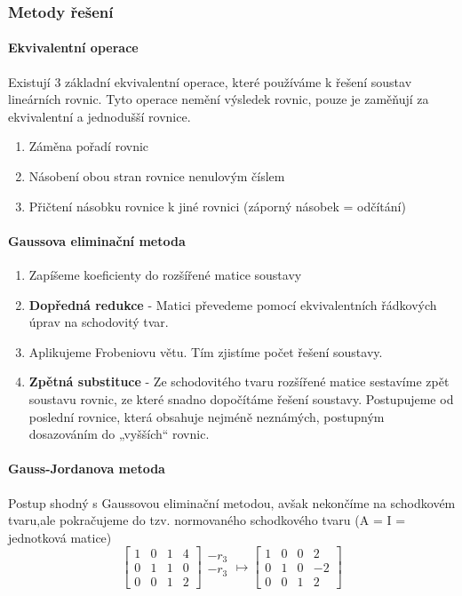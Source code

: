 \documentclass[10pt,a4paper]{article}
\begin{document}
\subsubsection{Metody řešení}
\paragraph{Ekvivalentní operace}
Existují 3 základní ekvivalentní operace, které používáme k řešení soustav lineárních rovnic. Tyto operace nemění výsledek rovnic, pouze je zaměňují za ekvivalentní a jednodušší rovnice.
\begin{enumerate}
\item Záměna pořadí rovnic
\item Násobení obou stran rovnice nenulovým číslem
\item Přičtení násobku rovnice k jiné rovnici (záporný násobek = odčítání)
\end{enumerate}
\paragraph{Gaussova eliminační metoda}
\begin{enumerate}
\item Zapíšeme koeficienty do rozšířené matice soustavy
\item \textbf{Dopředná redukce} - Matici převedeme pomocí ekvivalentních řádkových úprav na schodovitý tvar.
\item Aplikujeme Frobeniovu větu. Tím zjistíme počet řešení soustavy.
\item \textbf{Zpětná substituce} - Ze schodovitého tvaru rozšířené matice sestavíme zpět soustavu rovnic, ze které snadno dopočítáme řešení soustavy. Postupujeme od poslední rovnice, která obsahuje nejméně neznámých, postupným dosazováním do „vyšších“ rovnic.
\end{enumerate}
\paragraph{Gauss-Jordanova metoda}
Postup shodný s Gaussovou eliminační metodou, avšak nekončíme na schodkovém tvaru,ale pokračujeme do tzv. normovaného schodkového tvaru (A = I = jednotková matice)
\begin{equation}
\left[{\begin{array}{ccc|r} 
1 & 0 & 1 & 4\\ 
0 & 1 & 1 & 0\\ 
0 & 0 & 1 & 2 
\end{array}}\right]
\begin{matrix}
-r_3\\ 
-r_3\\ 
~
\end{matrix} 
\mapsto 
\left[{\begin{array}{ccc|r}
1 & 0 & 0 & 2\\ 
0 & 1 & 0 & -2\\ 
0 & 0 & 1 & 2 
\end{array}}\right] 
\end{equation}
\end{document}
